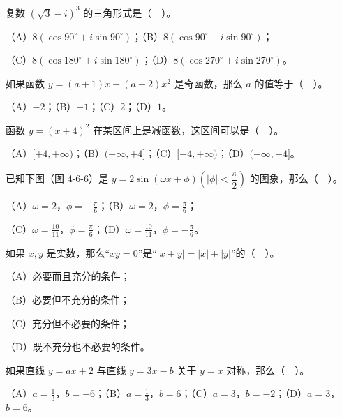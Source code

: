 \begin{question}
复数 $(\sqrt3-i)^3$ 的三角形式是（　）。

（A）$8(\cos 90^\circ+i\sin 90^\circ)$；（B）$8(\cos 90^\circ-i\sin 90^\circ)$；

（C）$8(\cos 180^\circ+i\sin 180^\circ)$；（D）$8(\cos 270^\circ+i\sin 270^\circ)$。

\end{question}
\begin{question}
如果函数 $y=(a+1)x-(a-2)x^2$ 是奇函数，那么 $a$ 的值等于（　）。

（A）$-2$；（B）$-1$；（C）$2$；（D）$1$。

\end{question}
\begin{question}
函数 $y=(x+4)^2$ 在某区间上是减函数，这区间可以是（　）。

（A）$[+4,+\infty)$；（B）$(-\infty,+4]$；（C）$[-4,+\infty)$；（D）$(-\infty,-4]$。

\Needspace{0.4\textheight}
\end{question}
\begin{question}
已知下图（图 4-6-6）是 $y=2\sin(\omega x+\phi)\left(|\phi|<\dfrac{\pi}{2}\right)$ 的图象，那么（　）。

（A）$\omega=2$，$\phi=-\frac{\pi}{6}$；（B）$\omega=2$，$\phi=\frac{\pi}{6}$；

（C）$\omega=\frac{10}{11}$，$\phi=\frac{\pi}{6}$；（D）$\omega=\frac{10}{11}$，$\phi=-\frac{\pi}{6}$。
\nopagebreak[4]
\begin{center}\end{center}
\nopagebreak[4]
\end{question}
\begin{question}
如果 $x,y$ 是实数，那么“$xy=0$”是“$|x+y|=|x|+|y|$”的（　）。

（A）必要而且充分的条件；

（B）必要但不充分的条件；

（C）充分但不必要的条件；

（D）既不充分也不必要的条件。

\end{question}
\begin{question}
如果直线 $y=ax+2$ 与直线 $y=3x-b$ 关于 $y=x$ 对称，那么（　）。

（A）$a=\frac13$，$b=-6$；（B）$a=\frac13$，$b=6$；（C）$a=3$，$b=-2$；（D）$a=3$，$b=6$。

\end{question}
